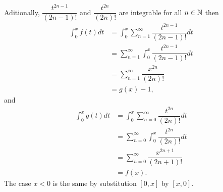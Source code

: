 \begin{problem}
\begin{solution}
\begin{itemize}
\begin{align*}
\end{align*}
Aditionally, $\dfrac{t^{2n-1}}{(2n-1)!}$ and $\dfrac{t^{2n}}{(2n)!}$ are integrable for all $n\in\mathbb{N}$ then 
\begin{align*}
    \int_0^xf(t) dt&=\int_0^x\sum_{n=1}^\infty \dfrac{t^{2n-1}}{(2n-1)!} dt\\
    &=\sum_{n=1}^\infty\int_0^x\dfrac{t^{2n-1}}{(2n-1)!} dt\\
    &=\sum_{n=1}^\infty\dfrac{x^{2n}}{(2n)!}\\
    &=g(x)-1,
\end{align*}
and 
\begin{align*}
    \int_0^xg(t) dt&=\int_0^x\sum_{n=0}^\infty \dfrac{t^{2n}}{(2n)!} dt\\
    &=\sum_{n=0}^\infty\int_0^x\dfrac{t^{2n}}{(2n)!} dt\\
    &=\sum_{n=0}^\infty\dfrac{x^{2n+1}}{(2n+1)!}\\
    &=f(x).
\end{align*}
The case $x<0$ is the same by substitution $[0,x]$ by $[x,0].$
\end{itemize}
\end{solution}
\end{problem}

